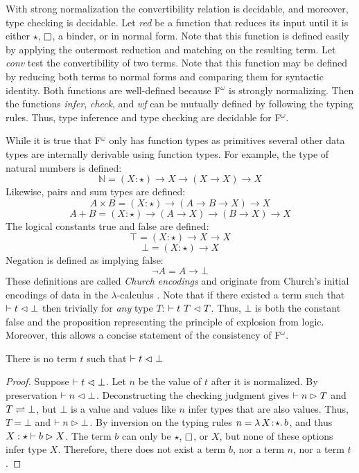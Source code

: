 With strong normalization the convertibility relation is decidable, and moreover, type checking is decidable.
Let \textit{red} be a function that reduces its input until it is either $\star$, $\kind$, a binder, or in normal form.
Note that this function is defined easily by applying the outermost reduction and matching on the resulting term.
Let \textit{conv} test the convertibility of two terms.
Note that this function may be defined by reducing both terms to normal forms and comparing them for syntactic identity.
Both functions are well-defined because F$^\omega$ is strongly normalizing.
Then the functions \textit{infer}, \textit{check}, and \textit{wf} can be mutually defined by following the typing rules.
Thus, type inference and type checking are decidable for F$^\omega$.

While it is true that F$^\omega$ only has function types as primitives several other data types are internally derivable using function types.
For example, the type of natural numbers is defined:
$$\mathbb{N} = (X : \star) \to X \to (X \to X) \to X$$
Likewise, pairs and sum types are defined:
$$A \times B = (X : \star) \to (A \to B \to X) \to X$$
$$A + B = (X : \star) \to (A \to X) \to (B \to X) \to X$$
The logical constants true and false are defined:
$$\top = (X : \star) \to X \to X$$
$$\bot = (X : \star) \to X$$
Negation is defined as implying false:
$$\neg A = A \to \bot$$
These definitions are called \textit{Church encodings} and originate from Church's initial encodings of data in the $\lambda$-calculus \cite{church1932,church1933}.
Note that if there existed a term such that $\vdash t \vartriangleleft \bot$ then trivially for \textit{any} type $T$: $\vdash t\ T \vartriangleleft T$.
Thus, $\bot$ is both the constant false and the proposition representing the principle of explosion from logic.
Moreover, this allows a concise statement of the consistency of F$^\omega$.

\begin{theorem}
    There is no term $t$ such that $\vdash t \vartriangleleft \bot$
\end{theorem}
\begin{proof}
    Suppose $\vdash t \vartriangleleft \bot$.
    Let $n$ be the value of $t$ after it is normalized.
    By preservation $\vdash n \vartriangleleft \bot$.
    Deconstructing the checking judgment gives $\vdash n \vartriangleright T$ and $T \rightleftharpoons \bot$, but $\bot$ is a value and values like $n$ infer types that are also values.
    Thus, $T = \bot$ and $\vdash n \vartriangleright \bot$.
    By inversion on the typing rules $n = {\lambda}\, X\! : \! \star.\, b$, and thus $X : \star \vdash b \vartriangleright X$.
    The term $b$ can only be $\star$, $\kind$, or $X$, but none of these options infer type $X$.
    Therefore, there does not exist a term $b$, nor a term $n$, nor a term $t$.
\end{proof}

